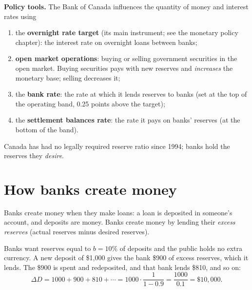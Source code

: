 \textbf{Policy tools.} The Bank of Canada influences the quantity of money and interest
rates using
\begin{enumerate}
  \item the \textbf{overnight rate target} (its main instrument; see the monetary policy
        chapter): the interest rate on overnight loans between banks;
  \item \textbf{open market operations}: buying or selling government securities in the
        open market. Buying securities pays with new reserves and \emph{increases} the
        monetary base; selling decreases it;
  \item the \textbf{bank rate}: the rate at which it lends reserves to banks (set at the
        top of the operating band, 0.25 points above the target);
  \item the \textbf{settlement balances rate}: the rate it pays on banks' reserves (at
        the bottom of the band).
\end{enumerate}
Canada has had no legally required reserve ratio since 1994; banks hold the reserves
they \emph{desire}.

\section{How banks create money}

Banks create money when they make loans: a loan is deposited in someone's account, and
deposits are money. Banks create money by lending their \emph{excess reserves}
(actual reserves minus desired reserves).

\begin{example}
Banks want reserves equal to $b = 10\%$ of deposits and the public holds no extra
currency. A new deposit of \$1{,}000 gives the bank \$900 of excess reserves, which it
lends. The \$900 is spent and redeposited, and that bank lends \$810, and so on:
\[
  \Delta D = 1000 + 900 + 810 + \cdots = 1000 \cdot \frac{1}{1 - 0.9} = \frac{1000}{0.1}
  = \$10{,}000.
\]
\end{example}

